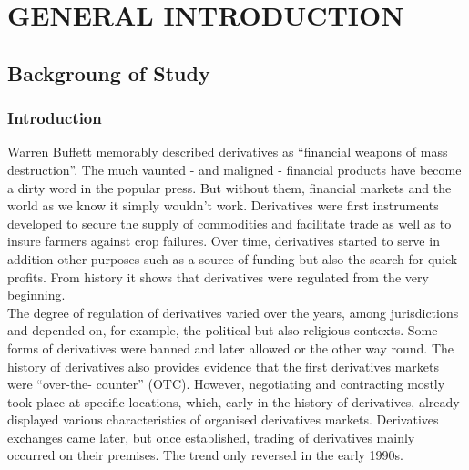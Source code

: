 \documentclass[a4 paper, 12pt]{report}
\theoremstyle{plain}
\begin{document}


\newpage 
\tableofcontents
{}


\newpage
\listoffigures
{}


\newpage
{}



\chapter{GENERAL INTRODUCTION}
\section{Backgroung of Study}
\subsection{Introduction}
\noindent
\par Warren Buffett memorably described derivatives as ``financial weapons of mass
destruction''. The much vaunted - and maligned - financial products have become a dirty
word in the popular press. But without them, financial markets and the world as we
know it simply wouldn't work. Derivatives were first instruments developed to secure the
supply of commodities and facilitate trade as well as to insure farmers against crop
failures. Over time, derivatives started to serve in addition other purposes such as a
source of funding but also the search for quick profits. From history it shows that
derivatives were regulated from the very beginning.\\
The degree of regulation of derivatives varied over the years, among jurisdictions and
depended on, for example, the political but also religious contexts. Some forms of
derivatives were banned and later allowed or the other way round. The history of
derivatives also provides evidence that the first derivatives markets were ``over-the-
counter'' (OTC). However, negotiating and contracting mostly took place at specific
locations, which, early in the history of derivatives, already displayed various
characteristics of organised derivatives markets. Derivatives exchanges came later, but
once established, trading of derivatives mainly occurred on their premises. The trend
only reversed in the early 1990s.
\end{document}
